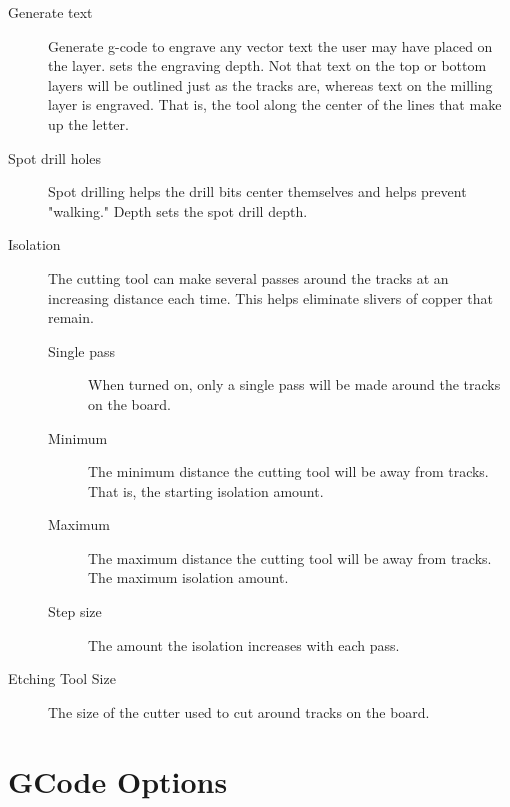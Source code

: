 \documentclass[11pt]{book}
\begin{document}
\begin{description}
\begin{description}
		\item[Generate text] Generate g-code to engrave any vector text the user may have placed on the  layer.  sets the engraving depth. Not that text on the top or bottom layers will be outlined just as the tracks are, whereas text on the milling layer is engraved. That is, the tool along the center of the lines that make up the letter.
		\item[Spot drill holes] Spot drilling helps the drill bits center themselves and helps prevent "walking." Depth sets the spot drill depth.
		\item[Isolation] The cutting tool can make several passes around the tracks at an increasing distance each time. This helps eliminate slivers of copper that remain.
		\begin{description}
			\item[Single pass] When turned on, only a single pass will be made around the tracks on the board.
			\item[Minimum] The minimum distance the cutting tool will be away from tracks. That is, the starting isolation amount.
			\item[Maximum] The maximum distance the cutting tool will be away from tracks. The maximum isolation amount.
			\item[Step size] The amount the isolation increases with each pass.
		\end{description}
		\item[Etching Tool Size] The size of the cutter used to cut around tracks on the board.
	\end{description}
\end{description}

%
%
\section{GCode Options}\label{sec:GCodeOptions}
\end{document}
